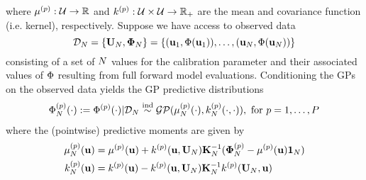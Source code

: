 \documentclass[12pt]{article}
\begin{document}
where $\GPMeanOut{\objIdx}: \parSpace \to \R$ and $\GPKerOut{\objIdx}: \parSpace \times \parSpace \to \R_+$ are the mean and covariance function (i.e. kernel), respectively. 
Suppose we have access to observed data 
\[\designData_{\Ndesign} = \{\designMat[\Ndesign], \indexDesign[\Ndesign]{\SSRObs}\} = \left\{(\bpar_1, \SSR(\bpar_1)), \dots, (\bpar_{\Ndesign}, \SSR(\bpar_{\Ndesign})) \right\}\]
consisting of a set of $\Ndesign$ values for the calibration parameter and their associated values of $\SSR$ resulting from full forward model evaluations. 
Conditioning the GPs on the observed data yields the GP predictive distributions
\begin{align} 
\indexDesignObj{\SSR}{\Ndesign}(\cdot) := \indexObj{\SSR}(\cdot)|\designData_{\Ndesign} \overset{\text{ind}}{\sim} \GP(\indexDesignObj{\GPMean}{\Ndesign}(\cdot), \indexDesignObj{\GPKer}{\Ndesign}(\cdot, \cdot)), \text{ for } \objIdx = 1, \dots, \Nobj
\end{align}
where the (pointwise) predictive moments are given by 
\begin{align}
\indexDesignObj{\GPMean}{\Ndesign}(\bpar) &= \indexObj{\GPMean}(\bpar) + \indexObj{\GPKer}(\bpar, \designMat[\Ndesign]) \KerMat[\Ndesign]^{-1} (\indexDesignObj{\SSRObs}{\Ndesign} - \indexObj{\GPMean}(\bpar) \oneVec{\Ndesign}) \label{GP_pred_mean} \\ 
\indexDesignObj{\GPKer}{\Ndesign}(\bpar) &= \indexObj{\GPKer}(\bpar) - \indexObj{\GPKer}(\bpar, \designMat[\Ndesign]) \KerMat[\Ndesign]^{-1} \indexObj{\GPKer}(\designMat[\Ndesign], \bpar) \label{GP_pred_var}
\end{align}

\end{document}
